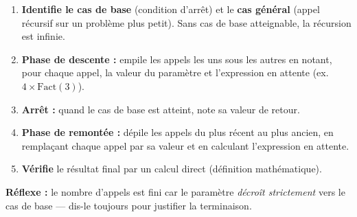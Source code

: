 \documentclass[11pt]{article}
\begin{document}
\begin{methode}
\begin{enumerate}
  \item \textbf{Identifie le cas de base} (condition d'arrêt) et le \textbf{cas général} (appel récursif sur un problème plus petit). Sans cas de base atteignable, la récursion est infinie.
  \item \textbf{Phase de descente :} empile les appels les uns sous les autres en notant, pour chaque appel, la valeur du paramètre et l'expression en attente (ex. $4 \times \text{Fact}(3)$).
  \item \textbf{Arrêt :} quand le cas de base est atteint, note sa valeur de retour.
  \item \textbf{Phase de remontée :} dépile les appels du plus récent au plus ancien, en remplaçant chaque appel par sa valeur et en calculant l'expression en attente.
  \item \textbf{Vérifie} le résultat final par un calcul direct (définition mathématique).
\end{enumerate}
\textbf{Réflexe :} le nombre d'appels est fini car le paramètre \emph{décroît strictement} vers le cas de base — dis-le toujours pour justifier la terminaison.
\end{methode}
\end{document}
